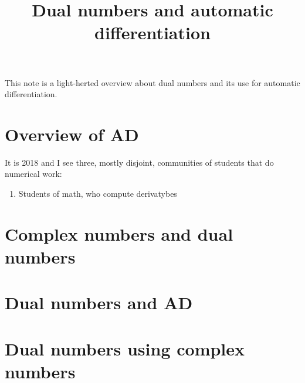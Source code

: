 \title{Dual numbers and automatic differentiation}

This note is a light-herted overview about dual numbers and its use for
automatic differentiation.

\section{Overview of AD}

It is 2018 and I see three, mostly disjoint, communities of
students that do numerical work:

\begin{enumerate}
	\item Students of math, who compute derivatybes
\end{enumerate}

\section{Complex numbers and dual numbers}

\section{Dual numbers and AD}

\section{Dual numbers using complex numbers}


